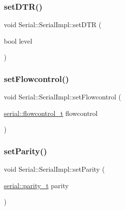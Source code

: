 \subsubsection{\texorpdfstring{set\+D\+T\+R()}{setDTR()}}
{\footnotesize\ttfamily void Serial\+::\+Serial\+Impl\+::set\+D\+TR (\begin{DoxyParamCaption}\item[{bool}]{level }\end{DoxyParamCaption})}

\mbox{\label{classserial_1_1serial_1_1_serial_1_1_serial_impl_abe20c54b814d70e1e0deaa8d3472babe}} 
\subsubsection{\texorpdfstring{set\+Flowcontrol()}{setFlowcontrol()}}
{\footnotesize\ttfamily void Serial\+::\+Serial\+Impl\+::set\+Flowcontrol (\begin{DoxyParamCaption}\item[{\mbox{\hyperlink{namespaceserial_a93ef57a314b4e562f9eded6c15d34351}{serial\+::flowcontrol\+\_\+t}}}]{flowcontrol }\end{DoxyParamCaption})}

\mbox{\label{classserial_1_1serial_1_1_serial_1_1_serial_impl_a7859629014393110fc76a55f1d956c3f}} 
\subsubsection{\texorpdfstring{set\+Parity()}{setParity()}}
{\footnotesize\ttfamily void Serial\+::\+Serial\+Impl\+::set\+Parity (\begin{DoxyParamCaption}\item[{\mbox{\hyperlink{namespaceserial_a8f45d26bf7c9a06659e75b5004a50481}{serial\+::parity\+\_\+t}}}]{parity }\end{DoxyParamCaption})}

